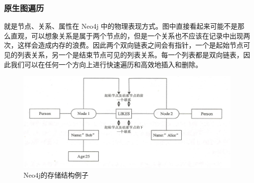 \subsubsection{原生图遍历}

 就是节点、关系、属性在 Neo4j 中的物理表现方式。图中直接看起来可能不是那么直观，可以想象关系是属于两个节点的，但是一个关系也不应该在记录中出现两次，这样会造成内存的浪费。因此两个双向链表之间会有指针，一个是起始节点可见的列表关系，另一个是结束节点可见的列表关系。每一个列表都是双向链表，因此我们可以在任何一个方向上进行快速遍历和高效地插入和删除。
\begin{figure}[H]
	\centering
	\includegraphics[width=1\textwidth]{images/18.png}
	\caption{Neo4j的存储结构例子}
	\label{fig:neo4j-case}
\end{figure}

